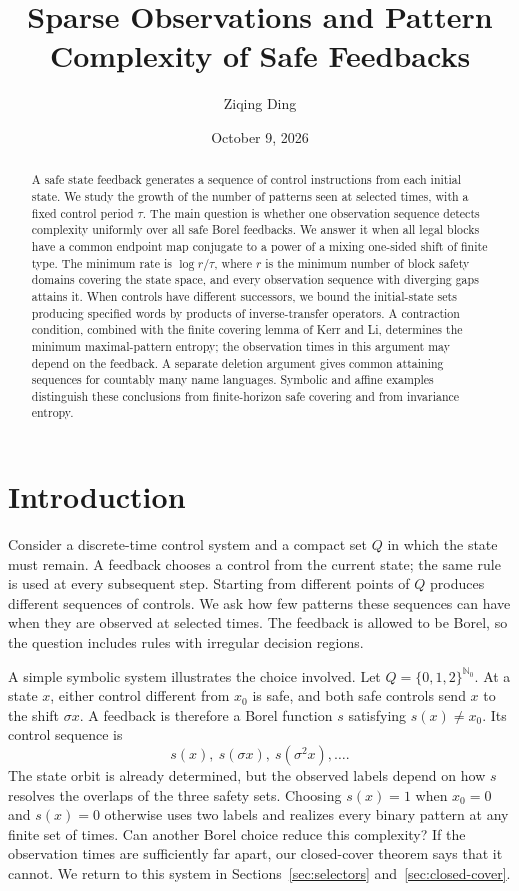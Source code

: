 \documentclass[11pt,reqno]{amsart}
\title[Sparse observations of safe feedbacks]{Sparse Observations and Pattern Complexity of Safe Feedbacks}
\author{Ziqing Ding}
\date{October 9, 2026}
\numberwithin{equation}{section}
\theoremstyle{definition}
\theoremstyle{definition}
\newcommand{\Nzero}{\mathbb N_0}
\begin{document}
\begin{abstract}
A safe state feedback generates a sequence of control instructions from
each initial state. We study the growth of the number of patterns seen
at selected times, with a fixed control period $\tau$. The main question
is whether one observation sequence detects complexity uniformly over
all safe Borel feedbacks. We answer it when all legal blocks have
a common endpoint map conjugate to a power of a mixing one-sided shift
of finite type. The minimum rate is $\log r/\tau$, where $r$ is the
minimum number of block safety domains covering the state space, and
every observation sequence with diverging gaps attains it. When controls
have different successors, we bound the initial-state sets producing
specified words by products of inverse-transfer operators. A contraction
condition, combined with the finite covering lemma of Kerr and Li,
determines the minimum maximal-pattern entropy; the observation times
in this argument may depend on the feedback. A separate deletion
argument gives common attaining sequences for countably many name
languages. Symbolic and affine examples distinguish these conclusions
from finite-horizon safe covering and from invariance entropy.
\end{abstract}
\maketitle

\section{Introduction}\label{sec:intro}

Consider a discrete-time control system and a compact set $Q$ in which
the state must remain. A feedback chooses a control from the current
state; the same rule is used at every subsequent step. Starting from
different points of $Q$ produces different sequences of controls. We
ask how few patterns these sequences can have when they are observed
at selected times. The feedback is allowed to be Borel, so the question
includes rules with irregular decision regions.

A simple symbolic system illustrates the choice involved. Let
$Q=\{0,1,2\}^{\Nzero}$. At a state $x$, either control different
from $x_0$ is safe, and both safe controls send $x$ to the shift
$\sigma x$. A feedback is therefore a Borel function $s$ satisfying
$s(x)\ne x_0$. Its control sequence is
\[
 s(x),\ s(\sigma x),\ s(\sigma^2x),\ldots.
\]
The state orbit is already determined, but the observed labels depend
on how $s$ resolves the overlaps of the three safety sets. Choosing
$s(x)=1$ when $x_0=0$ and $s(x)=0$ otherwise uses two labels and
realizes every binary pattern at any finite set of times. Can another
Borel choice reduce this complexity? If the observation times are
sufficiently far apart, our closed-cover theorem says that it cannot.
We return to this system in Sections~\ref{sec:selectors}
and~\ref{sec:closed-cover}.
\end{document}
